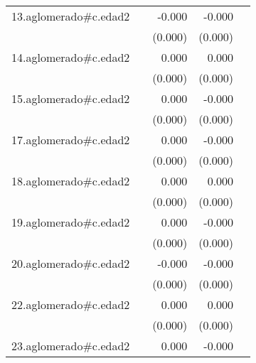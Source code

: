 {\begin{longtable}{l*{4}{D{.}{.}{-1}}}
\addlinespace
13.aglomerado#c.edad2&                     &      -0.000         &      -0.000\sym{*}  &                     \\
            &                     &     (0.000)         &     (0.000)         &                     \\
\addlinespace
14.aglomerado#c.edad2&                     &       0.000         &       0.000         &                     \\
            &                     &     (0.000)         &     (0.000)         &                     \\
\addlinespace
15.aglomerado#c.edad2&                     &       0.000         &      -0.000         &                     \\
            &                     &     (0.000)         &     (0.000)         &                     \\
\addlinespace
17.aglomerado#c.edad2&                     &       0.000         &      -0.000         &                     \\
            &                     &     (0.000)         &     (0.000)         &                     \\
\addlinespace
18.aglomerado#c.edad2&                     &       0.000         &       0.000\sym{*}  &                     \\
            &                     &     (0.000)         &     (0.000)         &                     \\
\addlinespace
19.aglomerado#c.edad2&                     &       0.000         &      -0.000         &                     \\
            &                     &     (0.000)         &     (0.000)         &                     \\
\addlinespace
20.aglomerado#c.edad2&                     &      -0.000\sym{*}  &      -0.000\sym{***}&                     \\
            &                     &     (0.000)         &     (0.000)         &                     \\
\addlinespace
22.aglomerado#c.edad2&                     &       0.000         &       0.000         &                     \\
            &                     &     (0.000)         &     (0.000)         &                     \\
\addlinespace
23.aglomerado#c.edad2&                     &       0.000         &      -0.000         &                     \\

\end{longtable}}
